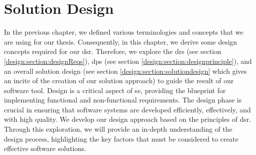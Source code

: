 
\chapter{Solution Design}
\label{chap:design}

\ifpdf
    \graphicspath{{Chapters/Design/Figs/}{Chapters/Design/Figs/}{Chapters/Design/Figs/}}
\else
    \graphicspath{{Chapters/Design/Figs/}{Chapters/Design/Figs/}}
\fi
In the previous chapter, we defined various terminologies and concepts that we are using for our thesis.
Consequently, in this chapter, we derive some design concepts required for our \ac{dsr}.
Therefore, we explore the \ac{dr}s (see section \ref{design:section:designReqs}), \ac{dp}s (see section \ref{design:section:designprinciple}), and an overall solution design (see section \ref{design:section:solutiondesign} which gives an incite of the creation of our solution approach) to guide the result of our software tool.
Design is a critical aspect of \ac{se}, providing the blueprint for implementing functional and non-functional requirements. 
The design phase is crucial in ensuring that software systems are developed efficiently, effectively, and with high quality. 
We develop our design approach based on the principles of \ac{dsr}. 
Through this exploration, we will provide an in-depth understanding of the design process, highlighting the key factors that must be considered to create effective software solutions.


